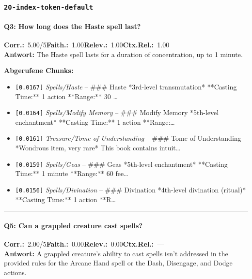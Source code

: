 \subsubsection*{\texttt{20-index-token-default}}
\label{app:samples:20_index_token_default}

\paragraph{Q3: How long does the Haste spell last?}
\noindent \textbf{Corr.:}~5.00/5\quad \textbf{Faith.:}~1.00\quad \textbf{Relev.:}~1.00\quad \textbf{Ctx.Rel.:}~1.00\\

\noindent\textbf{Antwort:} The Haste spell lasts for a duration of concentration, up to 1 minute.

\noindent\textbf{Abgerufene Chunks:}
\begin{itemize}[noitemsep, topsep=2pt]
  \item[\textbf{\#1}] \texttt{[0.0167]} \textit{Spells/Haste} -- \#\#\# Haste  *3rd-level transmutation*  **Casting Time:** 1 action  **Range:** 30 \ldots
  \item[\textbf{\#2}] \texttt{[0.0164]} \textit{Spells/Modify Memory} -- \#\#\# Modify Memory  *5th-level enchantment*  **Casting Time:** 1 action  **Range:\ldots
  \item[\textbf{\#3}] \texttt{[0.0161]} \textit{Treasure/Tome of Understanding} -- \#\#\# Tome of Understanding  *Wondrous item, very rare*  This book contains intuit\ldots
  \item[\textbf{\#4}] \texttt{[0.0159]} \textit{Spells/Geas} -- \#\#\# Geas  *5th-level enchantment*  **Casting Time:** 1 minute  **Range:** 60 fee\ldots
  \item[\textbf{\#5}] \texttt{[0.0156]} \textit{Spells/Divination} -- \#\#\# Divination  *4th-level divination (ritual)*  **Casting Time:** 1 action  **R\ldots
\end{itemize}
\vspace{4pt}
\hrule
\vspace{6pt}

\paragraph{Q5: Can a grappled creature cast spells?}
\noindent \textbf{Corr.:}~2.00/5\quad \textbf{Faith.:}~0.00\quad \textbf{Relev.:}~0.00\quad \textbf{Ctx.Rel.:}~—\\

\noindent\textbf{Antwort:} A grappled creature's ability to cast spells isn't addressed in the provided rules for the Arcane Hand spell or the Dash, Disengage, and Dodge actions.


